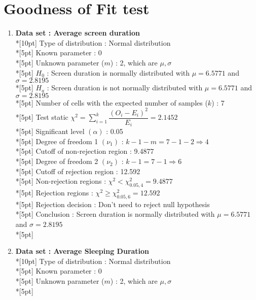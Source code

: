 \section*{Goodness of Fit test}
\begin{enumerate}
    \item \textbf{Data set : Average screen duration}\\*[10pt]
        Type of distribution : Normal distribution\\*[5pt]
        Known parameter : 0\\*[5pt]
        Unknown parameter ($m$) : 2, which are \(\mu, \sigma\)\\*[5pt]
        $H_0$ : Screen duration is normally distributed with $\mu=6.5771$ and $\sigma=2.8195$\\*[5pt]
        $H_a$ : Screen duration is not normally distributed with $\mu=6.5771$ and $\sigma=2.8195$\\*[5pt]
        Number of cells with the expected number of samples ($k$) : 7\\*[5pt]
        Test static \(\chi^2=\displaystyle\sum\limits^k_{i=1}\dfrac{\left(O_i-E_i\right)^2}{E_i} = 2.1452\)\\*[5pt]
        Significant level \(\left(\alpha\right)\) : 0.05\\*[5pt]
        Degree of freedom 1 \((\nu_1)\) : $k - 1 - m = 7 - 1 - 2 \Rightarrow 4$\\*[5pt]
        Cutoff of non-rejection region : 9.4877\\*[5pt]
        Degree of freedom 2 \((\nu_2)\) : $k - 1 = 7 - 1 \Rightarrow 6$\\*[5pt]
        Cutoff of rejection region : 12.592\\*[5pt]
        Non-rejection regions : \(\chi^2 < \chi^2_{0.05, 4}=9.4877\)\\*[5pt]
        Rejection regions : \(\chi^2 \geq \chi^2_{0.05, 6}=12.592\)\\*[5pt]
        Rejection decision : Don't need to reject null hypothesis\\*[5pt]
        Conclusion : Screen duration is normally distributed with $\mu=6.5771$ and $\sigma=2.8195$\\*[5pt]
    \item \textbf{Data set : Average Sleeping Duration}\\*[10pt]
        Type of distribution : Normal distribution\\*[5pt]
        Known parameter : 0\\*[5pt]
        Unknown parameter ($m$) : 2, which are \(\mu, \sigma\)\\*[5pt]

\end{enumerate}
